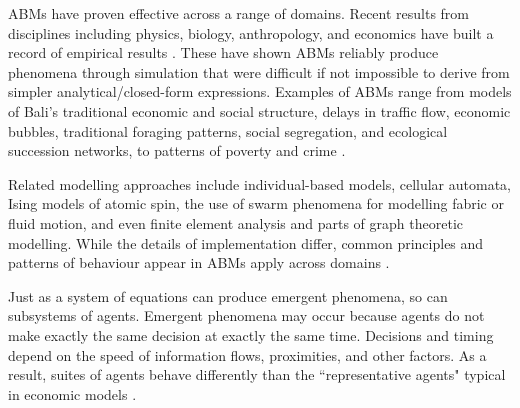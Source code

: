 ABMs have proven effective across a range of domains. Recent results from disciplines including physics, biology, anthropology, and economics have built a record of empirical results \cite{parkerMultiAgentSystemsSimulation2003, parker_multi-agent_2003, helbing_social_2011-1}. 
These have shown ABMs reliably produce phenomena through simulation that were difficult if not impossible to derive from simpler analytical/closed-form expressions. 
Examples of ABMs range from models of Bali's traditional economic and social structure, delays in traffic flow, economic bubbles, 
traditional foraging patterns, %
social segregation, and ecological succession networks, to patterns of poverty and crime \cite{open_agent_based_modeling_consortium_comses_????}. %

Related modelling approaches include individual-based models, cellular automata, Ising models of atomic spin, the use of swarm phenomena for modelling fabric or fluid motion, and even finite element analysis and parts of graph theoretic modelling.  While the details of implementation differ, common principles and patterns of behaviour appear in ABMs apply across domains \cite{shalizi_methods_2006}.  

Just as a system of equations can produce emergent phenomena, so can subsystems of agents. Emergent phenomena may occur because agents do not make exactly the same decision at exactly the same time. Decisions and timing depend on the speed of information flows, proximities, and other factors. As a result, suites of agents behave differently than the ``representative agents" typical in economic models \cite{darley_towards_1999, tesfatsion_agent-based_2002}.


